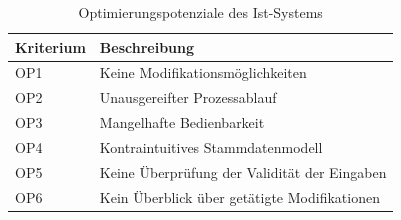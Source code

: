 \begin{table}[H]
	\centering
	\begin{tabularx}{\textwidth}{l X} 
		\toprule
		\textbf{Kriterium}  &   
		\textbf{Beschreibung}  \\ 
		\midrule
		OP1 &   
		Keine Modifikationsmöglichkeiten  \\  \cmidrule(r){1-1} \cmidrule(r){2-2}
		OP2 &   
		Unausgereifter Prozessablauf \\ \cmidrule(r){1-1} \cmidrule(r){2-2}
		OP3 &   
		Mangelhafte Bedienbarkeit  \\ \cmidrule(r){1-1} \cmidrule(r){2-2}
		OP4 &   
		Kontraintuitives Stammdatenmodell  \\ \cmidrule(r){1-1} \cmidrule(r){2-2}
		OP5 &   
		Keine Überprüfung der Validität der Eingaben  \\ \cmidrule(r){1-1} \cmidrule(r){2-2}
		OP6 &   
		Kein Überblick über getätigte Modifikationen  \\
	    \bottomrule
	\end{tabularx}
	\caption{\label{tab:potentiale}Optimierungspotenziale des Ist-Systems}
\end{table}













